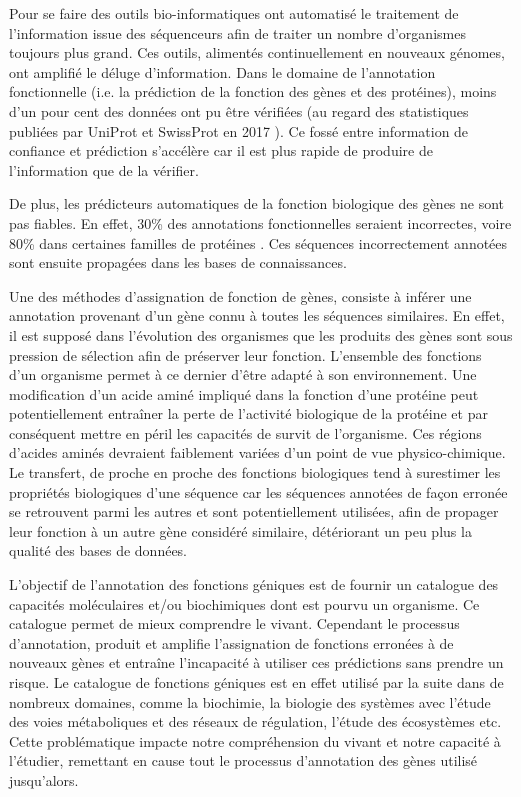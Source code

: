 \begin{refsegment}
Pour se faire des outils bio-informatiques ont automatisé le traitement de l'information issue des séquenceurs afin de traiter un nombre d'organismes toujours plus grand. Ces outils, alimentés continuellement en nouveaux génomes, ont amplifié le déluge d'information. Dans le domaine de l'annotation fonctionnelle (i.e. la prédiction de la fonction des gènes et des protéines), moins d'un pour cent des données ont pu être vérifiées (au regard des statistiques publiées par UniProt et SwissProt en 2017 \parencites{uniprot_stat}{expasy_stat} ). Ce fossé entre information de confiance et prédiction s'accélère car il est plus rapide de produire de l'information que de la vérifier.

De plus, les prédicteurs automatiques de la fonction biologique des gènes ne sont pas fiables. En effet, 30\% des annotations fonctionnelles seraient incorrectes, voire 80\% dans certaines familles de protéines \parencites{devos2001intrinsic}{schnoes2009annotation}. Ces séquences incorrectement annotées sont ensuite propagées dans les bases de connaissances.

Une des méthodes d'assignation de fonction de gènes, consiste à inférer une annotation provenant d'un gène connu à toutes les séquences similaires. En effet, il est supposé dans l’évolution des organismes que les produits des gènes sont sous pression de sélection afin de préserver leur fonction. L'ensemble des fonctions d'un organisme permet à ce dernier d'être adapté à son environnement. Une modification d'un acide aminé impliqué dans la fonction d’une protéine peut potentiellement entraîner la perte de l'activité biologique de la protéine et par conséquent mettre en péril les capacités de survit de l'organisme. Ces régions d'acides aminés devraient faiblement variées d'un point de vue physico-chimique. Le transfert, de proche en proche des fonctions biologiques tend à surestimer les propriétés biologiques d'une séquence car les séquences annotées de façon erronée se retrouvent parmi les autres et sont potentiellement utilisées, afin de propager leur fonction à un autre gène considéré similaire, détériorant un peu plus la qualité des bases de données.

L'objectif de l'annotation des fonctions géniques est de fournir un catalogue des capacités moléculaires et/ou biochimiques dont est pourvu un organisme. Ce catalogue permet de mieux comprendre le vivant. Cependant le processus d'annotation, produit et amplifie l'assignation de fonctions erronées à de nouveaux gènes et entraîne l'incapacité à utiliser ces prédictions sans prendre un risque. Le catalogue de fonctions géniques est en effet utilisé par la suite dans de nombreux domaines, comme la biochimie, la biologie des systèmes avec l’étude des voies métaboliques et des réseaux de régulation, l'étude des écosystèmes etc. Cette problématique impacte notre compréhension du vivant et notre capacité à l'étudier, remettant en cause tout le processus d'annotation des gènes utilisé jusqu'alors.


\end{refsegment}
